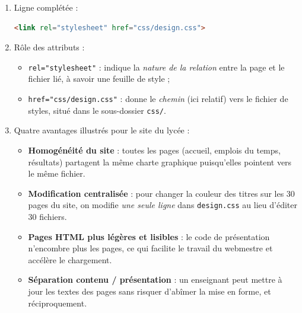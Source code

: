 \documentclass[11pt]{article}
\begin{document}
\begin{corrige}
\begin{enumerate}
  \item Ligne complétée :
\begin{lstlisting}[language=HTML]
<link rel="stylesheet" href="css/design.css">
\end{lstlisting}
  \item Rôle des attributs :
  \begin{itemize}
    \item \texttt{rel="stylesheet"} : indique la \emph{nature de la relation} entre la page et le fichier lié, à savoir une feuille de style ;
    \item \texttt{href="css/design.css"} : donne le \emph{chemin} (ici relatif) vers le fichier de styles, situé dans le sous-dossier \texttt{css/}.
  \end{itemize}
  \item Quatre avantages illustrés pour le site du lycée :
  \begin{itemize}
    \item \textbf{Homogénéité du site} : toutes les pages (accueil, emplois du temps, résultats) partagent la même charte graphique puisqu'elles pointent vers le même fichier.
    \item \textbf{Modification centralisée} : pour changer la couleur des titres sur les 30 pages du site, on modifie \emph{une seule ligne} dans \texttt{design.css} au lieu d'éditer 30 fichiers.
    \item \textbf{Pages HTML plus légères et lisibles} : le code de présentation n'encombre plus les pages, ce qui facilite le travail du webmestre et accélère le chargement.
    \item \textbf{Séparation contenu / présentation} : un enseignant peut mettre à jour les textes des pages sans risquer d'abîmer la mise en forme, et réciproquement.
  \end{itemize}
\end{enumerate}
\end{corrige}
\end{document}
